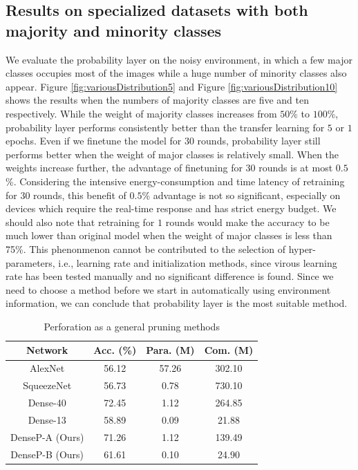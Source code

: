 \documentclass[pageno]{jpaper}
\begin{document}
\subsection{Results on specialized datasets with both majority and minority classes}
We evaluate the probability layer on the noisy environment, in which a few major classes occupies most of the images while a huge number of minority classes also appear. Figure \ref{fig:variousDistribution5} and Figure \ref{fig:variousDistribution10} shows the results when the numbers of majority classes are five and ten respectively. While the weight of majority classes increases from $50$\% to $100$\%, probability layer performs consistently better than the transfer learning for $5$ or $1$ epochs. Even if we finetune the model for $30$ rounds, probability layer still performs better when the weight of major classes is relatively small. When the weights increase further, the advantage of finetuning for $30$ rounds is at most $0.5$\%. Considering the intensive energy-consumption and time latency of retraining for $30$ rounds, this benefit of $0.5$\% advantage is not so significant, especially on devices which require the real-time response and has strict energy budget. We should also note that retraining for $1$ rounds would make the accuracy to be much lower than original model when the weight of major classes is less than 75\%. This phenonmenon cannot be contributed to the selection of hyper-parameters, i.e., learning rate and initialization methods, since virous learning rate has been tested manually and no significant difference is found. Since we need to choose a method before we start in automatically using environment information, we can conclude that probability layer is the most suitable method.




\begin{table}
    \caption{Perforation as a general pruning methods}
    \label{tab:generalPrune}

    \centering
    \begin{tabular}{ c|c|cc } 
     \hline
     Network & Acc. (\%) & Para. (M) & Com. (M) \\ 
     \hline
     AlexNet \cite{ahmed2016network, NIPS2012_4824} & 56.12 & 57.26 & 302.10 \\
     SqueezeNet \cite{iandola2016squeezenet} & 56.73 & 0.78 & 730.10 \\
     \hline
     Dense-40 \cite{huang2017densely} & 72.45 & 1.12 & 264.85 \\
     Dense-13 \cite{huang2017densely}& 58.89 & 0.09 & 21.88 \\
     \hline
     DenseP-A (Ours)& 71.26 & 1.12 & 139.49 \\
     DenseP-B (Ours)& 61.61 & 0.10 & 24.90 \\
     \hline
    \end{tabular}
\end{table}
\end{document}
